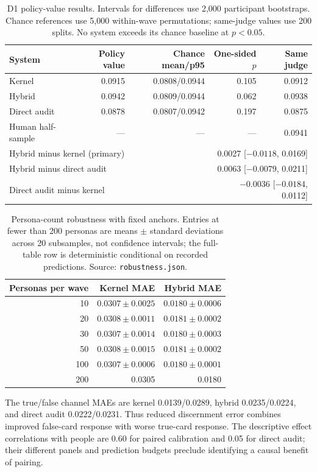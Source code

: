 \documentclass[11pt]{article}
\begin{document}
\begin{table}[!htbp]
\centering\small
\caption{D1 policy-value results. Intervals for differences use 2,000 participant bootstraps. Chance references use 5,000 within-wave permutations; same-judge values use 200 splits. No system exceeds its chance baseline at $p<0.05$.}
\begin{tabular}{lrrrr}
\toprule
System & Policy value & Chance mean/p95 & One-sided $p$ & Same judge\\
\midrule
Kernel & 0.0915 & 0.0808/0.0944 & 0.105 & 0.0912\\
Hybrid & 0.0942 & 0.0809/0.0944 & 0.062 & 0.0938\\
Direct audit & 0.0878 & 0.0807/0.0942 & 0.197 & 0.0875\\
Human half-sample & --- & --- & --- & 0.0941\\
\midrule
\multicolumn{3}{l}{Hybrid minus kernel (primary)} & \multicolumn{2}{r}{0.0027 [$-0.0118$, 0.0169]}\\
\multicolumn{3}{l}{Hybrid minus direct audit} & \multicolumn{2}{r}{0.0063 [$-0.0079$, 0.0211]}\\
\multicolumn{3}{l}{Direct audit minus kernel} & \multicolumn{2}{r}{$-0.0036$ [$-0.0184$, 0.0112]}\\
\bottomrule
\end{tabular}
\end{table}

\begin{table}[!htbp]
\centering\small
\caption{Persona-count robustness with fixed anchors. Entries at fewer than 200 personas are means $\pm$ standard deviations across 20 subsamples, not confidence intervals; the full-table row is deterministic conditional on recorded predictions. Source: \texttt{robustness.json}.}
\begin{tabular}{rrr}
\toprule
Personas per wave & Kernel MAE & Hybrid MAE\\
\midrule
10 & $0.0307\pm0.0025$ & $0.0180\pm0.0006$\\
20 & $0.0308\pm0.0011$ & $0.0181\pm0.0002$\\
30 & $0.0307\pm0.0014$ & $0.0180\pm0.0003$\\
50 & $0.0308\pm0.0015$ & $0.0181\pm0.0002$\\
100 & $0.0307\pm0.0006$ & $0.0180\pm0.0001$\\
200 & 0.0305 & 0.0180\\
\bottomrule
\end{tabular}
\end{table}
The true/false channel MAEs are kernel 0.0139/0.0289, hybrid 0.0235/0.0224, and direct audit 0.0222/0.0231. Thus reduced discernment error combines improved false-card response with worse true-card response. The descriptive effect correlations with people are 0.60 for paired calibration and 0.05 for direct audit; their different panels and prediction budgets preclude identifying a causal benefit of pairing.
\end{document}
